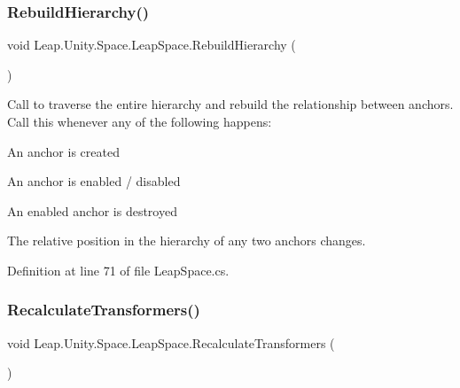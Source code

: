 \mbox{\label{class_leap_1_1_unity_1_1_space_1_1_leap_space_ae41c6fa919d7fe3f52cb1917e8874cd3}} 
\subsubsection{\texorpdfstring{RebuildHierarchy()}{RebuildHierarchy()}}
{\footnotesize\ttfamily void Leap.\+Unity.\+Space.\+Leap\+Space.\+Rebuild\+Hierarchy (\begin{DoxyParamCaption}{ }\end{DoxyParamCaption})}



Call to traverse the entire hierarchy and rebuild the relationship between anchors. Call this whenever any of the following happens\+: 


\begin{DoxyItemize}
\item An anchor is created
\item An anchor is enabled / disabled
\item An enabled anchor is destroyed
\item The relative position in the hierarchy of any two anchors changes. 
\end{DoxyItemize}

Definition at line 71 of file Leap\+Space.\+cs.

\mbox{\label{class_leap_1_1_unity_1_1_space_1_1_leap_space_ad576147f05921e27d31504aca66a4e06}} 
\subsubsection{\texorpdfstring{RecalculateTransformers()}{RecalculateTransformers()}}
{\footnotesize\ttfamily void Leap.\+Unity.\+Space.\+Leap\+Space.\+Recalculate\+Transformers (\begin{DoxyParamCaption}{ }\end{DoxyParamCaption})}



